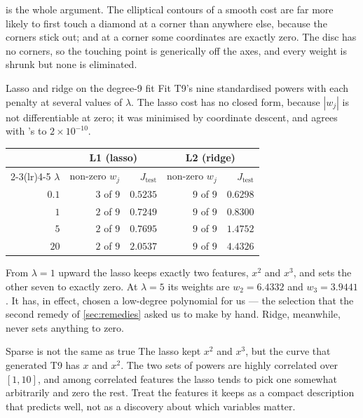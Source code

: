  is the whole argument. The elliptical contours of a smooth cost
are far more likely to first touch a diamond at a corner than anywhere else,
because the corners stick out; and at a corner some coordinates are exactly
zero. The disc has no corners, so the touching point is generically off the
axes, and every weight is shrunk but none is eliminated.

\begin{workedexample}{Lasso and ridge on the degree-9 fit}
Fit T9's nine standardised powers with each penalty at several values of
$\lambda$. The lasso cost has no closed form, because $|w_j|$ is not
differentiable at zero; it was minimised by coordinate descent, and agrees with
's  to $2\times10^{-10}$.

\begin{center}
\small
\renewcommand{\arraystretch}{1.15}
\begin{tabular}{@{}rrrrr@{}}
\toprule
 & \multicolumn{2}{c}{L1 (lasso)} & \multicolumn{2}{c}{L2 (ridge)}\\
\cmidrule(lr){2-3}\cmidrule(lr){4-5}
$\lambda$ & non-zero $w_j$ & $J_{\text{test}}$ & non-zero $w_j$ & $J_{\text{test}}$\\
\midrule
$0.1$ & $3$ of $9$ & $0.5235$ & $9$ of $9$ & $0.6298$\\
$1$   & $2$ of $9$ & $0.7249$ & $9$ of $9$ & $0.8300$\\
$5$   & $2$ of $9$ & $0.7695$ & $9$ of $9$ & $1.4752$\\
$20$  & $2$ of $9$ & $2.0537$ & $9$ of $9$ & $4.4326$\\
\bottomrule
\end{tabular}
\end{center}

From $\lambda = 1$ upward the lasso keeps exactly two features, $x^2$ and $x^3$,
and sets the other seven to exactly zero. At $\lambda = 5$ its weights are
$w_2 = 6.4332$ and $w_3 = 3.9441$. It has, in effect, chosen a low-degree
polynomial for us --- the selection that the second remedy of
\cref{sec:remedies} asked us to make by hand. Ridge, meanwhile, never sets
anything to zero.
\end{workedexample}

\begin{pitfall}{Sparse is not the same as true}
The lasso kept $x^2$ and $x^3$, but the curve that generated T9 has $x$ and
$x^2$. The two sets of powers are highly correlated over $[1,10]$, and among
correlated features the lasso tends to pick one somewhat arbitrarily and zero
the rest. Treat the features it keeps as a compact description that predicts
well, not as a discovery about which variables matter.
\end{pitfall}

